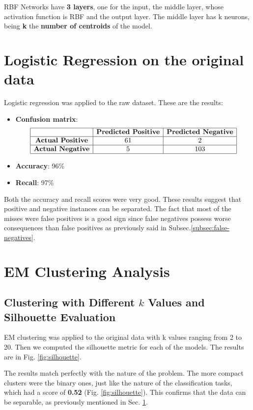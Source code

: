 \documentclass[a4paper,12pt]{article}
\begin{document}
RBF Networks have \textbf{3 layers}, one for the input, the middle layer, whose activation function is RBF and the output layer. The middle layer has k neurons, being \textbf{k} the \textbf{number of centroids} of the model.

\section{Logistic Regression on the original data}
\label{sec:logistic-regression-original}
Logistic regression was applied to the raw dataset. These are the results:
\begin{itemize}
    \item \textbf{Confusion matrix}: 
    \[
    \begin{array}{|c|c|c|}
    \hline
    & \textbf{Predicted Positive} & \textbf{Predicted Negative} \\
    \hline
    \textbf{Actual Positive} & 61 & 2 \\
    \hline
    \textbf{Actual Negative} & 5 & 103 \\
    \hline
    \end{array}
    \]
    \item \textbf{Accuracy}: 96\%
    \item \textbf{Recall}: 97\%

    
\end{itemize}

Both the accuracy and recall scores were very good. These results suggest that positive and negative instances can be separated. The fact that most of the misses were false positives is a good sign since false negatives possess worse consequences than false positives as previously said in Subsec.\ref{subsec:false-negatives}.

\section{EM Clustering Analysis}
\label{sec:em-clustering}

\subsection{Clustering with Different \(k\) Values and Silhouette Evaluation}
EM clustering was applied to the original data with k values ranging from 2 to 20. Then we computed the silhouette metric for each of the models. The results are in Fig. \ref{fig:silhouette}. 

The results match perfectly with the nature of the problem. The more compact clusters were the binary ones, just like the nature of the classification tasks, which had a score of \textbf{0.52} (Fig. \ref{fig:silhouette}). This confirms that the data can be separable, as previously mentioned in Sec. \ref{sec:logistic-regression-original}.
\end{document}
